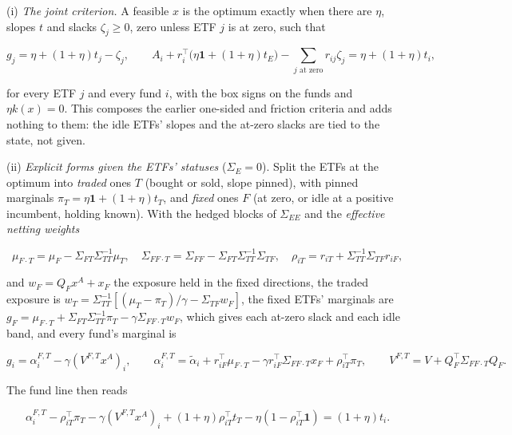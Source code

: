 \documentclass[11pt]{article}
\begin{document}
(i) \emph{The joint criterion.} A feasible \(x\) is the optimum exactly when
there are \(\eta\), slopes \(t\) and slacks \(\zeta_j\geq0\), zero unless ETF \(j\) is at
zero, such that

\begin{equation*}
g_j=\eta+(1+\eta)t_j-\zeta_j,\qquad
A_i+r_i^\top\bigl(\eta\mathbf1+(1+\eta)t_E\bigr)-\sum_{j\text{ at zero}}r_{ij}\zeta_j=\eta+(1+\eta)t_i,\tag{132}\label{eq:132}
\end{equation*}

for every ETF \(j\) and every fund \(i\), with the box signs on the funds and
\(\eta k(x)=0\). This composes the earlier one-sided and friction criteria
and adds nothing to them: the idle ETFs' slopes and the at-zero slacks
are tied to the state, not given.

(ii) \emph{Explicit forms given the ETFs' statuses} (\(\Sigma_E=0\)). Split the ETFs
at the optimum into \emph{traded} ones \(T\) (bought or sold, slope pinned),
with pinned marginals \(\pi_T=\eta\mathbf1+(1+\eta)t_T\), and \emph{fixed} ones \(F\) (at zero,
or idle at a positive incumbent, holding known). With the hedged
blocks of \(\Sigma_{EE}\) and the \emph{effective netting weights}

\begin{equation*}
\mu_{F\cdot T}=\mu_F-\Sigma_{FT}\Sigma_{TT}^{-1}\mu_T,\quad
\Sigma_{FF\cdot T}=\Sigma_{FF}-\Sigma_{FT}\Sigma_{TT}^{-1}\Sigma_{TF},\quad
\rho_{iT}=r_{iT}+\Sigma_{TT}^{-1}\Sigma_{TF}r_{iF},\tag{133}\label{eq:133}
\end{equation*}

and \(w_F=Q_Fx^A+x_F\) the exposure held in the fixed directions, the traded
exposure is \(w_T=\Sigma_{TT}^{-1}[(\mu_T-\pi_T)/\gamma-\Sigma_{TF}w_F]\), the fixed ETFs' marginals are
\(g_F=\mu_{F\cdot T}+\Sigma_{FT}\Sigma_{TT}^{-1}\pi_T-\gamma\Sigma_{FF\cdot T}w_F\), which gives each at-zero slack and
each idle band, and every fund's marginal is

\begin{equation*}
g_i=\alpha^{F,T}_i-\gamma(V^{F,T}x^A)_i,\qquad
\alpha^{F,T}_i=\tilde\alpha_i+r_{iF}^\top\mu_{F\cdot T}-\gamma r_{iF}^\top\Sigma_{FF\cdot T}x_F+\rho_{iT}^\top\pi_T,\qquad
V^{F,T}=V+Q_F^\top\Sigma_{FF\cdot T}Q_F.\tag{134}\label{eq:134}
\end{equation*}

The fund line then reads

\begin{equation*}
\alpha^{F,T}_i-\rho_{iT}^\top\pi_T-\gamma(V^{F,T}x^A)_i+(1+\eta)\rho_{iT}^\top t_T-\eta(1-\rho_{iT}^\top\mathbf1)=(1+\eta)t_i.\tag{135}\label{eq:135}
\end{equation*}
\end{document}
